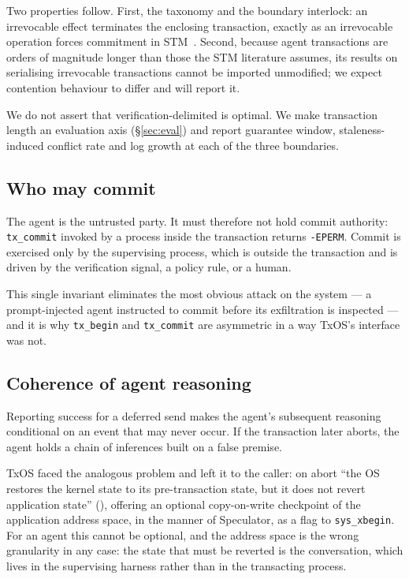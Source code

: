 \documentclass[10pt,twocolumn]{article}
\begin{document}
Two properties follow. First, the taxonomy and the boundary interlock: an
irrevocable effect terminates the enclosing transaction, exactly as an
irrevocable operation forces commitment in
STM~\cite{welc2008irrevocable}. Second, because agent transactions are orders of
magnitude longer than those the STM literature assumes, its results on
serialising irrevocable transactions cannot be imported unmodified; we expect
contention behaviour to differ and will report it.

We do not assert that verification-delimited is optimal. We make transaction
length an evaluation axis (\S\ref{sec:eval}) and report guarantee window,
staleness-induced conflict rate and log growth at each of the three boundaries.

\subsection{Who may commit}
\label{sec:authority}

The agent is the untrusted party. It must therefore not hold commit authority:
\texttt{tx\_commit} invoked by a process inside the transaction returns
\texttt{-EPERM}. Commit is exercised only by the supervising process, which is
outside the transaction and is driven by the verification signal, a policy rule,
or a human.

This single invariant eliminates the most obvious attack on the system --- a
prompt-injected agent instructed to commit before its exfiltration is
inspected --- and it is why \texttt{tx\_begin} and \texttt{tx\_commit} are
asymmetric in a way TxOS's interface was not.

\subsection{Coherence of agent reasoning}
\label{sec:coherence}

Reporting success for a deferred send makes the agent's subsequent reasoning
conditional on an event that may never occur. If the transaction later aborts,
the agent holds a chain of inferences built on a false premise.

TxOS faced the analogous problem and left it to the caller: on abort ``the OS
restores the kernel state to its pre-transaction state, but it does not revert
application state'' (\cite[\S3.1.4]{porter2009txos}), offering an optional
copy-on-write checkpoint of the application address space, in the manner of
Speculator, as a flag to \texttt{sys\_xbegin}. For an agent this cannot be
optional, and the address space is the wrong granularity in any case: the state
that must be reverted is the conversation, which lives in the supervising
harness rather than in the transacting process.
\end{document}

